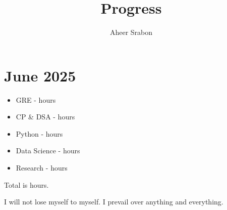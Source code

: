 \documentclass[11pt]{article}
\title{Progress}
\author{Aheer Srabon}
\date{}
\begin{document}
\maketitle

\section*{June 2025}



\begin{itemize}
\itemsep0em
  \item GRE           - \juneGRE hours
  \item CP \& DSA     - \juneDSACP hours
  \item Python        - \junePYTHON hours
  \item Data Science  - \juneDS hours
  \item Research      - \juneRESEARCH hours
\end{itemize}

\noindent Total is \juneTOTAL{} hours.

\vspace{0.5cm}


\noindent I will not lose myself to myself. I prevail over anything and everything.
\end{document}
